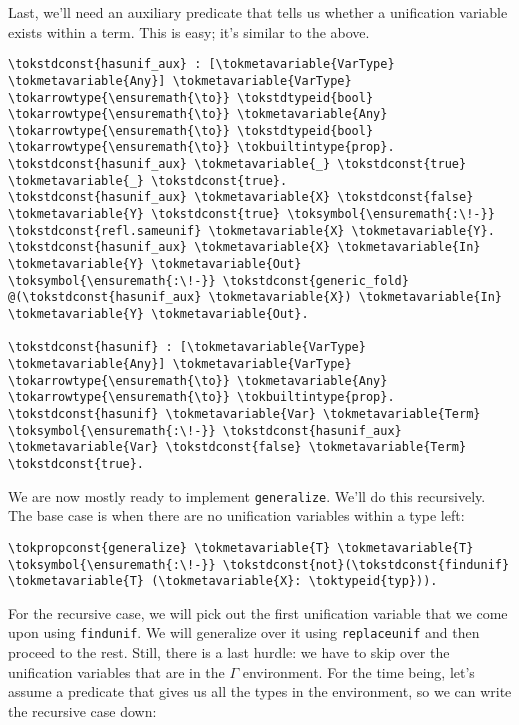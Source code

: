 Last, we'll need an auxiliary predicate that tells us whether a
unification variable exists within a term. This is easy; it's similar to
the above.

\begin{verbatim}
\tokstdconst{hasunif_aux} : [\tokmetavariable{VarType} \tokmetavariable{Any}] \tokmetavariable{VarType} \tokarrowtype{\ensuremath{\to}} \tokstdtypeid{bool} \tokarrowtype{\ensuremath{\to}} \tokmetavariable{Any} \tokarrowtype{\ensuremath{\to}} \tokstdtypeid{bool} \tokarrowtype{\ensuremath{\to}} \tokbuiltintype{prop}.
\tokstdconst{hasunif_aux} \tokmetavariable{_} \tokstdconst{true} \tokmetavariable{_} \tokstdconst{true}.
\tokstdconst{hasunif_aux} \tokmetavariable{X} \tokstdconst{false} \tokmetavariable{Y} \tokstdconst{true} \toksymbol{\ensuremath{:\!-}} \tokstdconst{refl.sameunif} \tokmetavariable{X} \tokmetavariable{Y}.
\tokstdconst{hasunif_aux} \tokmetavariable{X} \tokmetavariable{In} \tokmetavariable{Y} \tokmetavariable{Out} \toksymbol{\ensuremath{:\!-}} \tokstdconst{generic_fold} @(\tokstdconst{hasunif_aux} \tokmetavariable{X}) \tokmetavariable{In} \tokmetavariable{Y} \tokmetavariable{Out}.

\tokstdconst{hasunif} : [\tokmetavariable{VarType} \tokmetavariable{Any}] \tokmetavariable{VarType} \tokarrowtype{\ensuremath{\to}} \tokmetavariable{Any} \tokarrowtype{\ensuremath{\to}} \tokbuiltintype{prop}.
\tokstdconst{hasunif} \tokmetavariable{Var} \tokmetavariable{Term} \toksymbol{\ensuremath{:\!-}} \tokstdconst{hasunif_aux} \tokmetavariable{Var} \tokstdconst{false} \tokmetavariable{Term} \tokstdconst{true}.
\end{verbatim}

We are now mostly ready to implement \texttt{generalize}. We'll do this
recursively. The base case is when there are no unification variables
within a type left:

\importantCodeblock{}

\begin{verbatim}
\tokpropconst{generalize} \tokmetavariable{T} \tokmetavariable{T} \toksymbol{\ensuremath{:\!-}} \tokstdconst{not}(\tokstdconst{findunif} \tokmetavariable{T} (\tokmetavariable{X}: \toktypeid{typ})).
\end{verbatim}

\importantCodeblockEnd{}

For the recursive case, we will pick out the first unification variable
that we come upon using \texttt{findunif}. We will generalize over it
using \texttt{replaceunif} and then proceed to the rest. Still, there is
a last hurdle: we have to skip over the unification variables that are
in the \(\Gamma\) environment. For the time being, let's assume a
predicate that gives us all the types in the environment, so we can
write the recursive case down:

